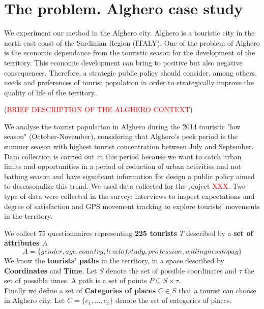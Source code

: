 \documentclass[a4paper]{article}
\begin{document}
\section{The problem. Alghero case study}
We experiment our method in the Alghero city. Alghero is a touristic city in the north east coast of the Sardinian Region (ITALY). One of the problem of  Alghero is the economic dependance from the touristic season for the development of the territory. This economic development can bring to positive but also negative consequences. Therefore, a strategic public policy should consider, among others, needs and preferences of tourist population in order to strategically improve the quality of life of the territory.

(\textcolor{red}{BRIEF DESCRIPTION OF THE ALGHERO CONTEXT})


We analyse the tourist population in Alghero during the 2014 touristic "low season" (October-November), considering that Alghero's peek period is the summer season with highest tourist concentration between July and September. Data collection is carried out in this period because we want to catch urban limits and opportunities in a period of reduction of urban activities and not bathing season and have significant information for design a public policy aimed to deseasonalize this trend.
We used data collected for the project \textcolor{red}{XXX}. Two type of data were collected in the survey: interviews to inspect expectations and degree of satisfaction and GPS movement tracking to explore tourists' movements in the territory.

We collect 75 questionnaires representing \textbf{225 tourists $T$} described by a \textbf{set of attributes $A$}
\begin{equation}
A=\{gender,age,country,level of study,profession,willingness to pay\}
\end{equation}
We know the \textbf{tourists' paths} in the territory, in a space described by \textbf{Coordinates} and \textbf{Time}.
Let $S$ denote the set of possible coordinates and $\tau$ the set of possible times.  A path is a set of points $P \subseteq S \times \tau$.\\
Finally we define a set of \textbf{Categories of places} $C \in S$ that a tourist can choose in Alghero city.
Let $C=\{c_1, \ldots, c_7\}$ denote the set of categories of places.
\end{document}
